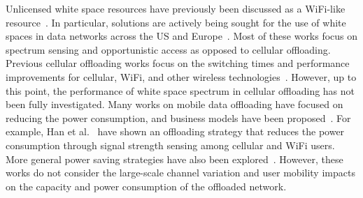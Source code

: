 Unlicensed white space resources have previously been discussed as a WiFi-like resource~\cite{bahl2009white}.
In particular, solutions are actively being sought for the use of white spaces in data networks across the US and Europe~\cite{lei2009ieee,van2011uhf}.
Most of these works focus on spectrum sensing and opportunistic access as opposed to cellular offloading.
Previous cellular offloading works focus on the switching times and performance improvements for cellular, WiFi, and other wireless technologies~\cite{singh2013offloading}.
However, up to this point, the performance of white space spectrum in cellular offloading has not been fully investigated.
Many works on mobile data offloading have focused on reducing the power consumption, and business models have been proposed~\cite{aijaz2013survey}.
For example, Han et al.~\cite{han2011mobile} have shown an offloading strategy that reduces the power consumption through signal strength sensing among cellular and WiFi users.
More general power saving strategies have also been explored~\cite{vereecken2011power}.
However, these works do not consider the large-scale channel variation and user mobility impacts on the capacity and power consumption of the offloaded network.


